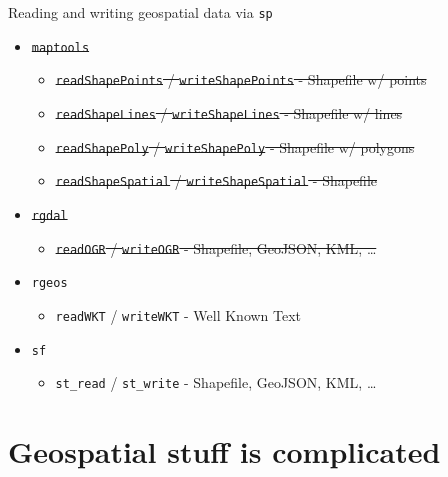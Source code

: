 \documentclass[11pt,ignorenonframetext,]{beamer}
\providecommand{\tightlist}{%
  \setlength{\itemsep}{0pt}\setlength{\parskip}{0pt}}
\begin{document}
\begin{frame}[fragile]{Reading and writing geospatial data via
\texttt{sp}}

\begin{itemize}
\tightlist
\item
  \sout{\texttt{maptools}}

  \begin{itemize}
  \tightlist
  \item
    \sout{\texttt{readShapePoints} / \texttt{writeShapePoints} -
    Shapefile w/ points}
  \item
    \sout{\texttt{readShapeLines} / \texttt{writeShapeLines} - Shapefile
    w/ lines}
  \item
    \sout{\texttt{readShapePoly} / \texttt{writeShapePoly} - Shapefile
    w/ polygons}
  \item
    \sout{\texttt{readShapeSpatial} / \texttt{writeShapeSpatial} -
    Shapefile}
  \end{itemize}
\item
  \sout{\texttt{rgdal}}

  \begin{itemize}
  \tightlist
  \item
    \sout{\texttt{readOGR} / \texttt{writeOGR} - Shapefile, GeoJSON,
    KML, \ldots{}}
  \end{itemize}
\item
  \texttt{rgeos}

  \begin{itemize}
  \tightlist
  \item
    \texttt{readWKT} / \texttt{writeWKT} - Well Known Text
  \end{itemize}
\item
  \texttt{sf}

  \begin{itemize}
  \tightlist
  \item
    \texttt{st\_read} / \texttt{st\_write} - Shapefile, GeoJSON, KML,
    \ldots{}
  \end{itemize}
\end{itemize}

\end{frame}

\section{Geospatial stuff is
complicated}\label{geospatial-stuff-is-complicated}
\end{document}
